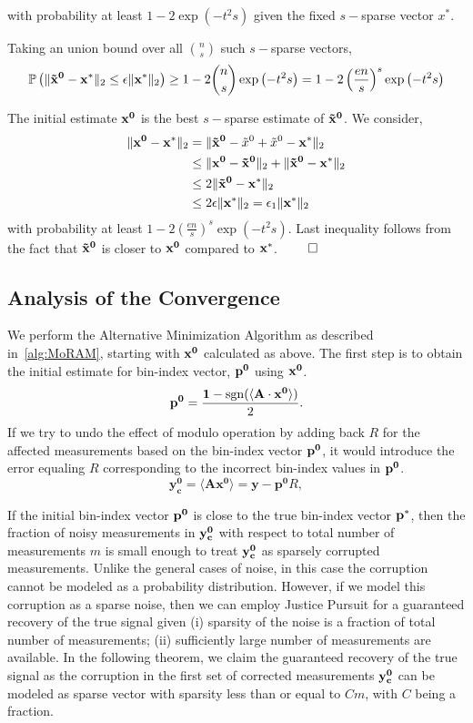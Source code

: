 with probability at least $1 - 2\exp\left(-t^2s\right)$ given the fixed $s-$sparse vector $x^*$.

Taking an union bound over all $n \choose s$ such $s-$sparse vectors,
$$
\mathbb{P}\left(\|\mathbf{\tilde{x}^0} - \mathbf{x^*}\|_2 \leq \epsilon \|\mathbf{x^*}\|_2\right) \geq 1 - 2{n \choose s}\exp\left(-t^2s\right) = 1 - 2\left(\frac{en}{s}\right)^s\exp\left(-t^2s\right)
$$

The initial estimate $\mathbf{x^0}$ is the best $s-$sparse estimate of $\mathbf{\tilde{x}^0}$. We consider,
\begin{align*}
\|\mathbf{{x}^0} - \mathbf{x^*}\|_2 &=  \|\mathbf{\tilde{x}^0} -\tilde{x}^0 +\tilde{x}^0 - \mathbf{x^*}\|_2 \\
& \leq \|\mathbf{{x}^0} -\mathbf{\tilde{x}^0}\|_2 +  \|\mathbf{\tilde{x}^0} - \mathbf{x^*}\|_2 \\
& \leq 2 \|\mathbf{\tilde{x}^0} - \mathbf{x^*}\|_2 \\
& \leq 2 \epsilon \|\mathbf{x^*}\|_2 = \epsilon_1 \|\mathbf{x^*}\|_2
\end{align*}
with probability at least $1 - 2\left(\frac{en}{s}\right)^s\exp\left(-t^2s\right)$.
Last inequality follows from the fact that $\mathbf{\tilde{x}^0}$ is closer to $\mathbf{x^0}$ compared to $\mathbf{x^*}$. $\qed$
\subsection{Analysis of the Convergence}
We perform the Alternative Minimization Algorithm as described in~\ref{alg:MoRAM}, starting with $\mathbf{x^0}$ calculated as above. 
The first step is to obtain the initial estimate for bin-index vector, $\mathbf{p^0}$ using $\mathbf{x^0}$.
$$
\mathbf{{p}^{0}} = \frac{\mathbf{1}-\mathrm{sgn}(\langle \mathbf{A} \cdot \mathbf{x^0} \rangle)}{2}.
$$
If we try to undo the effect of modulo operation by adding back $R$ for the affected measurements based on the bin-index vector $\mathbf{p^0}$, it would introduce the error equaling $R$ corresponding to the incorrect bin-index values in $\mathbf{p^0}$.
$$
\mathbf{y^0_c} = \langle \mathbf{A}\mathbf{x^{0}} \rangle = \mathbf{y} - \mathbf{p^0}R,
$$

If the initial bin-index vector $\mathbf{p^0}$ is close to the true bin-index vector $\mathbf{p^*}$, then the fraction of noisy measurements in $\mathbf{y^0_c}$ with respect to total number of measurements $m$ is small enough to treat $\mathbf{y^0_c}$ as sparsely corrupted measurements. Unlike the general cases of noise, in this case the corruption cannot be modeled as a probability distribution. However, if we model this corruption as a sparse noise, then we can employ Justice Pursuit for a guaranteed recovery of the true signal given (i) sparsity of the noise is a fraction of total number of measurements; (ii) sufficiently large number of measurements are available. In the following theorem, we claim the guaranteed recovery of the true signal as the corruption in the first set of corrected measurements $\mathbf{y_c^0}$ can be modeled as sparse vector with sparsity less than or equal to $Cm$, with $C$ being a fraction. 

